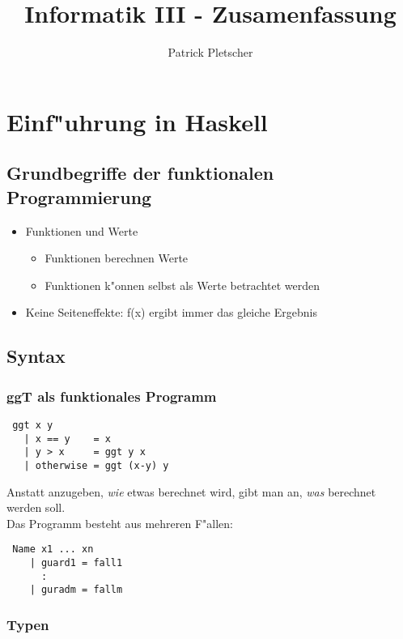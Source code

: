 \documentclass[german,10pt, a4paper, twocolumn]{scrartcl}
\title{Informatik III - Zusamenfassung}
\author{Patrick Pletscher}
\theoremstyle{definition}
\theoremstyle{remark}
\begin{document}
\maketitle

\section{Einf"uhrung in Haskell}

\subsection{Grundbegriffe der funktionalen Programmierung}

\begin{itemize}
 \item Funktionen und Werte
 \begin{itemize}
  \item Funktionen berechnen Werte
  \item Funktionen k"onnen selbst als Werte betrachtet werden
 \end{itemize}
 \item Keine Seiteneffekte: f(x) ergibt immer das gleiche Ergebnis
\end{itemize}

\subsection{Syntax}

\subsubsection{ggT als funktionales Programm}

\begin{verbatim}
 ggt x y
   | x == y    = x
   | y > x     = ggt y x
   | otherwise = ggt (x-y) y
\end{verbatim}

Anstatt anzugeben, \textit{wie} etwas berechnet wird, gibt man an, \textit{was} berechnet werden soll.\\

Das Programm besteht aus mehreren F"allen:
\begin{verbatim}
 Name x1 ... xn
    | guard1 = fall1
      :
    | guradm = fallm
\end{verbatim}

\subsubsection{Typen}
\end{document}
